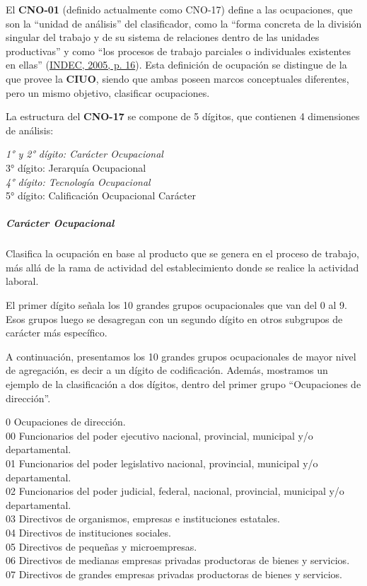 \documentclass[
]{article}
\begin{document}
El \textbf{CNO-01} (definido actualmente como CNO-17) define a las ocupaciones, que son la ``unidad de análisis'' del clasificador, como la ``forma concreta de la división singular del trabajo y de su sistema de relaciones dentro de las unidades productivas'' y como ``los procesos de trabajo parciales o individuales existentes en ellas'' (\protect\hyperlink{ref-INDEC2005}{INDEC, 2005, p. 16}). Esta definición de ocupación se distingue de la que provee la \textbf{CIUO}, siendo que ambas poseen marcos conceptuales diferentes, pero un mismo objetivo, clasificar ocupaciones.

La estructura del \textbf{CNO-17} se compone de 5 dígitos, que contienen 4 dimensiones de análisis:

\emph{1° y 2° dígito: Carácter Ocupacional\\
}3° dígito: Jerarquía Ocupacional\\
\emph{4° dígito: Tecnología Ocupacional\\
}5° dígito: Calificación Ocupacional Carácter

\hypertarget{caruxe1cter-ocupacional}{%
\subparagraph{Carácter Ocupacional}\label{caruxe1cter-ocupacional}}

Clasifica la ocupación en base al producto que se genera en el proceso de trabajo, más allá de la rama de actividad del establecimiento donde se realice la actividad laboral.

El primer dígito señala los 10 grandes grupos ocupacionales que van del 0 al 9. Esos grupos luego se desagregan con un segundo dígito en otros subgrupos de carácter más específico.

A continuación, presentamos los 10 grandes grupos ocupacionales de mayor nivel de agregación, es decir a un dígito de codificación. Además, mostramos un ejemplo de la clasificación a dos dígitos, dentro del primer grupo ``Ocupaciones de dirección''.

0 Ocupaciones de dirección.\\
00 Funcionarios del poder ejecutivo nacional, provincial, municipal y/o departamental.\\
01 Funcionarios del poder legislativo nacional, provincial, municipal y/o departamental.\\
02 Funcionarios del poder judicial, federal, nacional, provincial, municipal y/o departamental.\\
03 Directivos de organismos, empresas e instituciones estatales.\\
04 Directivos de instituciones sociales.\\
05 Directivos de pequeñas y microempresas.\\
06 Directivos de medianas empresas privadas productoras de bienes y servicios.\\
07 Directivos de grandes empresas privadas productoras de bienes y servicios.
\end{document}
